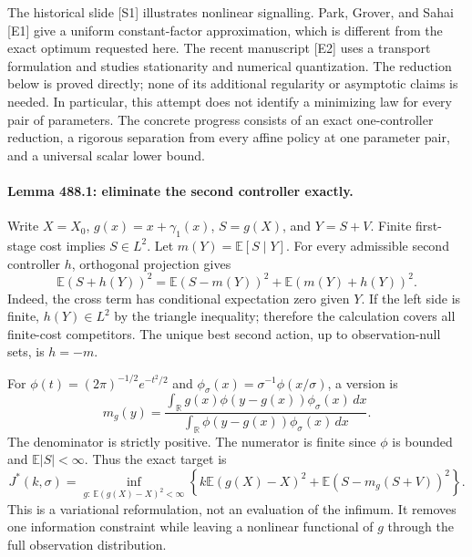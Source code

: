 \documentclass[11pt]{article}
\begin{document}
The historical slide [S1] illustrates nonlinear signalling. Park, Grover,
and Sahai [E1] give a uniform constant-factor approximation, which is
different from the exact optimum requested here. The recent manuscript
[E2] uses a transport formulation and studies stationarity and numerical
quantization. The reduction below is proved directly; none of its
additional regularity or asymptotic claims is needed. In particular, this
attempt does not identify a minimizing law for every pair of parameters.
The concrete progress consists of an exact one-controller reduction,
a rigorous separation from every affine policy at one parameter pair,
and a universal scalar lower bound.

\paragraph{Lemma 488.1: eliminate the second controller exactly.}
Write $X=X_0$, $g(x)=x+\gamma_1(x)$, $S=g(X)$, and $Y=S+V$.
Finite first-stage cost implies $S\in L^2$. Let $m(Y)=\mathbb E[S\mid Y]$.
For every admissible second controller $h$, orthogonal projection gives
\begin{equation}\label{a488:projection}
 \mathbb E(S+h(Y))^2
 =\mathbb E(S-m(Y))^2+\mathbb E(m(Y)+h(Y))^2.
\end{equation}
Indeed, the cross term has conditional expectation zero given $Y$.
If the left side is finite, $h(Y)\in L^2$ by the triangle inequality;
therefore the calculation covers all finite-cost competitors. The unique
best second action, up to observation-null sets, is $h=-m$.

For $\phi(t)=(2\pi)^{-1/2}e^{-t^2/2}$ and
$\phi_\sigma(x)=\sigma^{-1}\phi(x/\sigma)$, a version is
\begin{equation}\label{a488:posterior}
 m_g(y)=
 \frac{\int_{\mathbb R}g(x)\phi(y-g(x))\phi_\sigma(x)\,dx}
      {\int_{\mathbb R}\phi(y-g(x))\phi_\sigma(x)\,dx}.
\end{equation}
The denominator is strictly positive. The numerator is finite since
$\phi$ is bounded and $\mathbb E|S|<\infty$. Thus the exact target is
\begin{equation}\label{a488:reduced}
 J^*(k,\sigma)=\inf_{g:\,\mathbb E(g(X)-X)^2<\infty}
 \left\{k\mathbb E(g(X)-X)^2+
              \mathbb E(S-m_g(S+V))^2\right\}.
\end{equation}
This is a variational reformulation, not an evaluation of the infimum.
It removes one information constraint while leaving a nonlinear
functional of $g$ through the full observation distribution.
\end{document}
